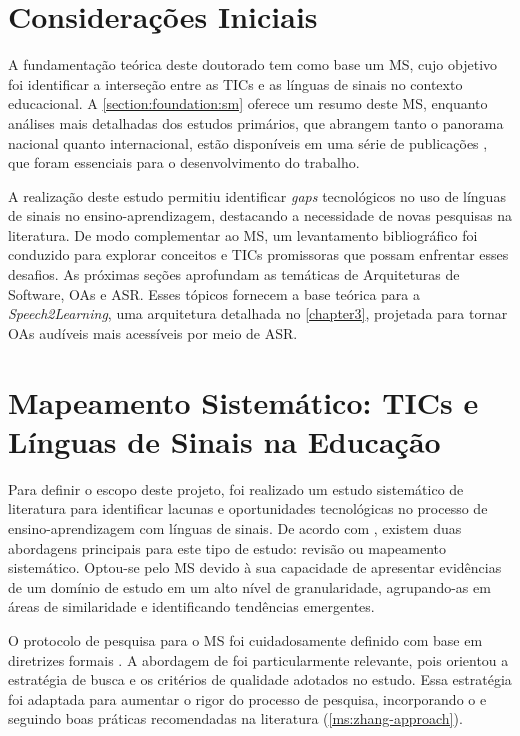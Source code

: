 \section{Considerações Iniciais}

A fundamentação teórica deste doutorado tem como base um MS, cujo objetivo foi identificar a interseção entre as TICs e as línguas de sinais no contexto educacional. A \autoref{section:foundation:sm} oferece um resumo deste MS, enquanto análises mais detalhadas dos estudos primários, que abrangem tanto o panorama nacional quanto internacional, estão disponíveis em uma série de publicações \cite{FalvoJr2020_FIE, FalvoJr2020_SBIE, FalvoJr2021_RENOTE}, que foram essenciais para o desenvolvimento do trabalho.

A realização deste estudo permitiu identificar \textit{gaps} tecnológicos no uso de línguas de sinais no ensino-aprendizagem, destacando a necessidade de novas pesquisas na literatura. De modo complementar ao MS, um levantamento bibliográfico foi conduzido para explorar conceitos e TICs promissoras que possam enfrentar esses desafios. As próximas seções aprofundam as temáticas de Arquiteturas de Software, OAs e ASR. Esses tópicos fornecem a base teórica para a \textit{Speech2Learning}, uma arquitetura detalhada no \autoref{chapter3}, projetada para tornar OAs audíveis mais acessíveis por meio de ASR.

\section{Mapeamento Sistemático: TICs e Línguas de Sinais na Educação}
\label{section:foundation:sm}

Para definir o escopo deste projeto, foi realizado um estudo sistemático de literatura para identificar lacunas e oportunidades tecnológicas no processo de ensino-aprendizagem com línguas de sinais. De acordo com , existem duas abordagens principais para este tipo de estudo: revisão ou mapeamento sistemático. Optou-se pelo MS devido à sua capacidade de apresentar evidências de um domínio de estudo em um alto nível de granularidade, agrupando-as em áreas de similaridade e identificando tendências emergentes.

O protocolo de pesquisa para o MS foi cuidadosamente definido com base em diretrizes formais  \cite{Kitchenham2007, Nakagawa2010, Zhang2011, Petersen2015}. A abordagem de  foi particularmente relevante, pois orientou a estratégia de busca e os critérios de qualidade adotados no estudo. Essa estratégia foi adaptada para aumentar o rigor do processo de pesquisa, incorporando o  e seguindo boas práticas recomendadas na literatura (\autoref{ms:zhang-approach}).

